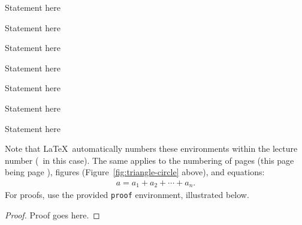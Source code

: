 \begin{definition}
Statement here
\end{definition}

\begin{example}
Statement here
\end{example}

\begin{assumption}
Statement here
\end{assumption}

\begin{remark}
Statement here
\end{remark}

\begin{conjecture}
Statement here
\end{conjecture}

\begin{openproblem}
Statement here
\end{openproblem}

\begin{problem}
Statement here
\end{problem}


\noindent
Note that \LaTeX\ automatically numbers these
environments within the lecture number (\thelecture\ in
this case).  The same applies to the numbering of pages
(this page being page \thepage), figures
(Figure~\ref{fig:triangle-circle} above), and
equations:
\begin{align}
a = a_1+a_2+\cdots+a_n.
\end{align}
\noindent
For proofs, use the provided {\tt proof} environment,
illustrated below.

\begin{proof}
Proof goes here.
\end{proof}
